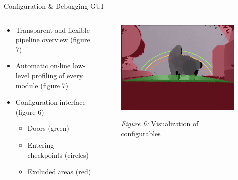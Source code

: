 \documentclass[final,hyperref={pdfpagelabels=false}]{beamer}
\begin{document}
\begin{frame}[t]
\begin{columns}[t]
\begin{column}{.465\textwidth}

\begin{block}{Configuration \& Debugging GUI}

\begin{columns} %
\begin{column}{.54\textwidth} %

\begin{itemize}
\item Transparent and flexible pipeline overview (figure 7)
\item Automatic on-line low-level profiling of every module (figure 7)
\item Configuration interface (figure 6)

\begin{itemize}
\item Doors (green)
\item Entering checkpoints (circles)
\item Excluded areas (red)
\end{itemize}
\end{itemize}

\end{column}

\begin{column}{.43\textwidth} %
\centering
\begin{figure}
\includegraphics[width=0.985\linewidth]{PosterConfigCrop.png}
\label{fig:Config}
\caption{\textit{Figure 6:} Visualization of configurables}
\end{figure}
\end{column}
\end{columns} %


\end{block}
\end{column}
\end{columns}
\end{frame}
\end{document}
